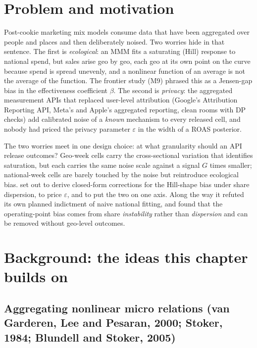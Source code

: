 \section{Problem and motivation}

Post-cookie marketing mix models consume data that have been aggregated over people and places and then deliberately noised. Two worries hide in that sentence. The first is \emph{ecological}: an MMM fits a saturating (Hill) response to national spend, but sales arise geo by geo, each geo at its own point on the curve because spend is spread unevenly, and a nonlinear function of an average is not the average of the function. The frontier study (M9) phrased this as a Jensen-gap bias in the effectiveness coefficient $\beta$. The second is \emph{privacy}: the aggregated measurement APIs that replaced user-level attribution (Google's Attribution Reporting API, Meta's and Apple's aggregated reporting, clean rooms with DP checks) add calibrated noise of a \emph{known} mechanism to every released cell, and nobody had priced the privacy parameter $\varepsilon$ in the width of a ROAS posterior.

The two worries meet in one design choice: at what granularity should an API release outcomes? Geo-week cells carry the cross-sectional variation that identifies saturation, but each carries the same noise scale against a signal $G$ times smaller; national-week cells are barely touched by the noise but reintroduce ecological bias.  set out to derive closed-form corrections for the Hill-shape bias under share dispersion, to price $\varepsilon$, and to put the two on one axis. Along the way it refuted its own planned indictment of naive national fitting, and found that the operating-point bias comes from share \emph{instability} rather than \emph{dispersion} and can be removed without geo-level outcomes.

\section{Background: the ideas this chapter builds on}

\subsection{Aggregating nonlinear micro relations (van Garderen, Lee and Pesaran, 2000; Stoker, 1984; Blundell and Stoker, 2005)}

